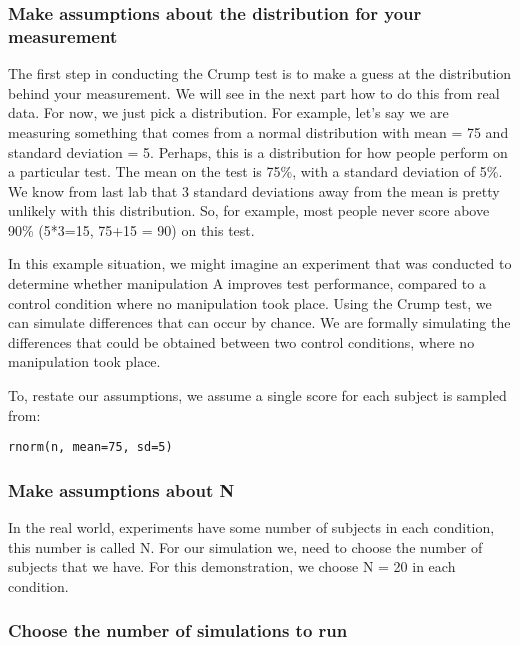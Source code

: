 \documentclass[
]{book}
\begin{document}
\hypertarget{make-assumptions-about-the-distribution-for-your-measurement}{%
\subsubsection{Make assumptions about the distribution for your measurement}\label{make-assumptions-about-the-distribution-for-your-measurement}}

The first step in conducting the Crump test is to make a guess at the distribution behind your measurement. We will see in the next part how to do this from real data. For now, we just pick a distribution. For example, let's say we are measuring something that comes from a normal distribution with mean = 75 and standard deviation = 5. Perhaps, this is a distribution for how people perform on a particular test. The mean on the test is 75\%, with a standard deviation of 5\%. We know from last lab that 3 standard deviations away from the mean is pretty unlikely with this distribution. So, for example, most people never score above 90\% (5*3=15, 75+15 = 90) on this test.

In this example situation, we might imagine an experiment that was conducted to determine whether manipulation A improves test performance, compared to a control condition where no manipulation took place. Using the Crump test, we can simulate differences that can occur by chance. We are formally simulating the differences that could be obtained between two control conditions, where no manipulation took place.

To, restate our assumptions, we assume a single score for each subject is sampled from:

\texttt{rnorm(n,\ mean=75,\ sd=5)}

\hypertarget{make-assumptions-about-n}{%
\subsubsection{Make assumptions about N}\label{make-assumptions-about-n}}

In the real world, experiments have some number of subjects in each condition, this number is called N. For our simulation we, need to choose the number of subjects that we have. For this demonstration, we choose N = 20 in each condition.

\hypertarget{choose-the-number-of-simulations-to-run}{%
\subsubsection{Choose the number of simulations to run}\label{choose-the-number-of-simulations-to-run}}
\end{document}
